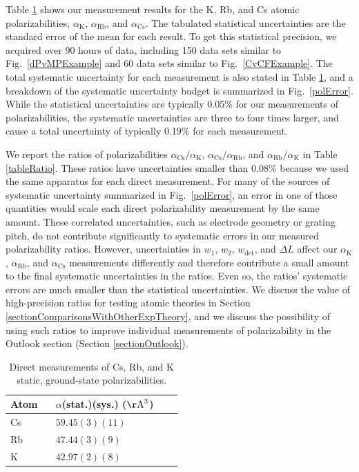 \documentclass[twocolumn,pra,showpacs,superscriptaddress,longbibliography]{revtex4-1}   %
\newcommand{\sspace}{$\enspace$}
\newcommand{\figref}[1]{Fig.~\ref{#1}}
\newcommand{\ak}{\alpha_{\textrm{K}}}
\newcommand{\arb}{\alpha_{\textrm{Rb}}}
\newcommand{\acs}{\alpha_{\textrm{Cs}}}
\newcommand{\polK}{42.97(2)(8)}
\newcommand{\polRb}{47.44(3)(9)}
\newcommand{\polCs}{59.45(3)(11)}
\newcommand{\AAA}{\mathrm{\AA}}
\begin{document}
Table \ref{tableAbs} shows our measurement results for the K, Rb, and Cs atomic polarizabilities, $\ak$, $\arb$, and $\acs$.  The tabulated statistical uncertainties are the standard error of the mean for each result.  To get this statistical precision, we acquired over 90 hours of data, including 150 data sets similar to \figref{dPvMPExample} and 60 data sets similar to \figref{CvCFExample}.   The total systematic uncertainty for each measurement is also stated in Table \ref{tableAbs}, and a breakdown of the systematic uncertainty budget is summarized in \figref{polError}.  While the statistical uncertainties are typically 0.05\% for our measurements of polarizabilities, the systematic uncertainties are three to four times larger, and cause a total uncertainty of typically 0.19\% for each measurement.

We report the ratios of polarizabilities $\acs/\ak$, $\acs/\arb$, and $\arb/\ak$ in Table \ref{tableRatio}.
These ratios have uncertainties smaller than 0.08\% because we used the same apparatus for each direct measurement.
For many of the sources of systematic uncertainty summarized in \figref{polError}, an error in one of those quantities would scale each direct polarizability measurement by the same amount. These correlated uncertainties, such as electrode geometry or grating pitch, do not contribute significantly to systematic errors in our measured polarizability ratios.
However, uncertainties in $w_1$, $w_2$, $w_{\mathrm{det}}$, and $\Delta L$ affect our $\ak$, $\arb$, and $\acs$ measurements differently and therefore contribute a small amount to the final systematic uncertainties in the ratios. Even so, the ratios' systematic errors are much smaller than the statistical uncertainties. 
We discuss the value of high-precision ratios for testing atomic theories in Section \ref{sectionComparisonsWithOtherExpTheory}, and we discuss the possibility of using such ratios to improve individual measurements of polarizability in the Outlook section (Section \ref{sectionOutlook}).

\begingroup
\begin{table}
\caption{\label{tableAbs}Direct measurements of Cs, Rb, and K static, ground-state polarizabilities.}
\begin{center}
\begin{tabular}{llll}
\hline\hline
Atom \sspace & $\alpha$(stat.)(sys.) ($\AAA^3$) \\
\hline
Cs & $\polCs$ \\
Rb & $\polRb$ \\
K  & $\polK$ \\
\hline\hline
\end{tabular}
\end{center}
\end{table}
\endgroup
\end{document}
